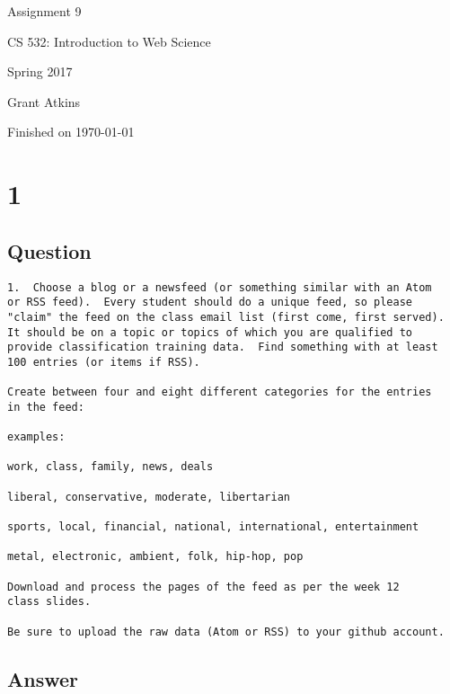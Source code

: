 \documentclass[letterpaper,11pt]{article}
\begin{document}
\begin{titlepage}

\begin{center}

\Huge{Assignment 9}

\Large{CS 532:  Introduction to Web Science}

\Large{Spring 2017}

\Large{Grant Atkins}

\Large Finished on \today

\end{center}

\end{titlepage}

\newpage


\section*{1}

\subsection*{Question}

\begin{verbatim}
1.  Choose a blog or a newsfeed (or something similar with an Atom
or RSS feed).  Every student should do a unique feed, so please
"claim" the feed on the class email list (first come, first served).
It should be on a topic or topics of which you are qualified to
provide classification training data.  Find something with at least
100 entries (or items if RSS).

Create between four and eight different categories for the entries
in the feed:

examples: 

work, class, family, news, deals

liberal, conservative, moderate, libertarian

sports, local, financial, national, international, entertainment

metal, electronic, ambient, folk, hip-hop, pop

Download and process the pages of the feed as per the week 12 
class slides.

Be sure to upload the raw data (Atom or RSS) to your github account.
\end{verbatim}

\clearpage
\subsection*{Answer}
\end{document}
